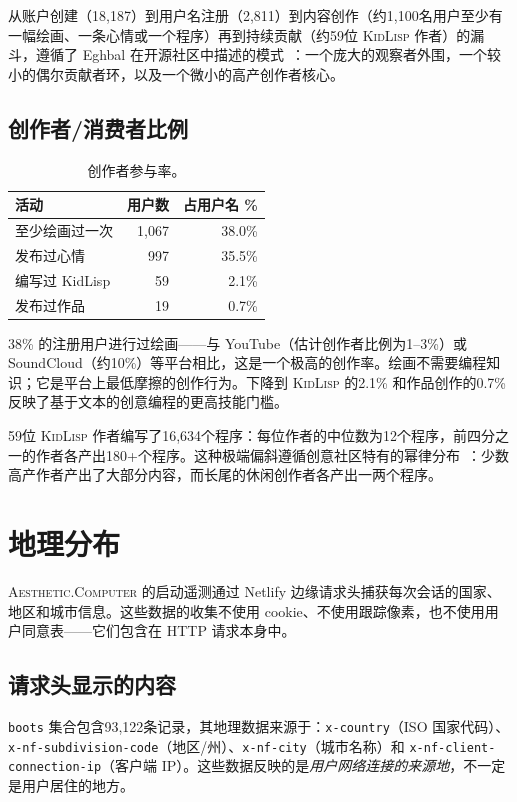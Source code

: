 \documentclass[10pt,letterpaper,twocolumn]{article}
\newcommand{\ac}{\textsc{Aesthetic.Computer}}
\newcommand{\kl}{\textsc{KidLisp}}
\begin{document}
从账户创建（18,187）到用户名注册（2,811）到内容创作（约1,100名用户至少有一幅绘画、一条心情或一个程序）再到持续贡献（约59位 \kl{} 作者）的漏斗，遵循了 Eghbal 在开源社区中描述的模式~\citep{eghbal2020working}：一个庞大的观察者外围，一个较小的偶尔贡献者环，以及一个微小的高产创作者核心。

\subsection{创作者/消费者比例}

\begin{table}[h]
\small
\centering
\begin{tabularx}{\columnwidth}{Xrr}
\toprule
\textbf{活动} & \textbf{用户数} & \textbf{占用户名 \%} \\
\midrule
至少绘画过一次 & 1,067 & 38.0\% \\
发布过心情 & 997 & 35.5\% \\
编写过 KidLisp & 59 & 2.1\% \\
发布过作品 & 19 & 0.7\% \\
\bottomrule
\end{tabularx}
\caption{创作者参与率。}
\label{tab:creators}
\end{table}

38\% 的注册用户进行过绘画——与 YouTube（估计创作者比例为1--3\%）或 SoundCloud（约10\%）等平台相比，这是一个极高的创作率。绘画不需要编程知识；它是平台上最低摩擦的创作行为。下降到 \kl{} 的2.1\% 和作品创作的0.7\% 反映了基于文本的创意编程的更高技能门槛。

59位 \kl{} 作者编写了16,634个程序：每位作者的中位数为12个程序，前四分之一的作者各产出180+个程序。这种极端偏斜遵循创意社区特有的幂律分布~\citep{barabasi1999emergence}：少数高产作者产出了大部分内容，而长尾的休闲创作者各产出一两个程序。

\section{地理分布}

\ac{} 的启动遥测通过 Netlify 边缘请求头捕获每次会话的国家、地区和城市信息。这些数据的收集不使用 cookie、不使用跟踪像素，也不使用用户同意表——它们包含在 HTTP 请求本身中。

\subsection{请求头显示的内容}

\texttt{boots} 集合包含93,122条记录，其地理数据来源于：\texttt{x-country}（ISO 国家代码）、\texttt{x-nf-subdivision-code}（地区/州）、\texttt{x-nf-city}（城市名称）和 \texttt{x-nf-client-connection-ip}（客户端 IP）。这些数据反映的是\emph{用户网络连接的来源地}，不一定是用户居住的地方。
\end{document}

